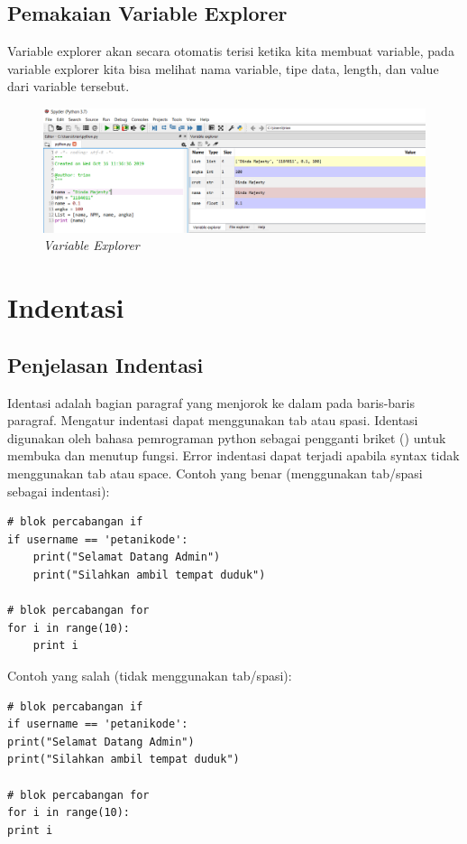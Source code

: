 \subsection{Pemakaian Variable Explorer}
Variable explorer akan secara otomatis terisi ketika kita membuat variable, pada variable explorer kita bisa melihat nama variable, tipe data, length, dan value dari variable tersebut.
\begin{figure}[H]
    \centering
    \includegraphics[scale=0.4]{figures/variable}
    \caption{\textit{Variable Explorer}}
    \label{Variable Explorer}
\end{figure}

\section{Indentasi}
\subsection{Penjelasan Indentasi}
Identasi adalah bagian paragraf yang menjorok ke dalam pada baris-baris paragraf. Mengatur indentasi dapat menggunakan tab atau spasi. Identasi digunakan oleh bahasa pemrograman python sebagai pengganti briket ({}) untuk membuka dan menutup fungsi. Error indentasi dapat terjadi apabila syntax tidak menggunakan tab atau space.
Contoh yang benar (menggunakan tab/spasi sebagai indentasi):
\begin{verbatim}
# blok percabangan if
if username == 'petanikode':
    print("Selamat Datang Admin")
    print("Silahkan ambil tempat duduk")

# blok percabangan for
for i in range(10):
    print i
\end{verbatim}
Contoh yang salah (tidak menggunakan tab/spasi):
\begin{verbatim}
# blok percabangan if
if username == 'petanikode':
print("Selamat Datang Admin")
print("Silahkan ambil tempat duduk")

# blok percabangan for
for i in range(10):
print i
\end{verbatim}

